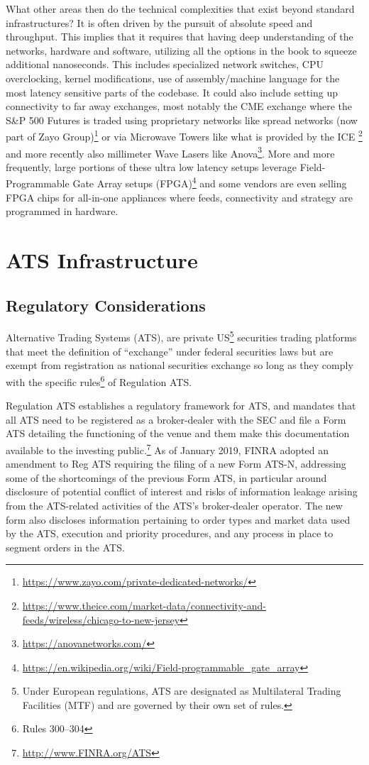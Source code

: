 What other areas then do the technical complexities that exist beyond standard infrastructures? It is often driven by the pursuit of absolute speed and throughput. This implies that it requires that having deep understanding of the networks, hardware and software, utilizing all the options in the book to squeeze additional nanoseconds. This includes specialized network switches, CPU overclocking, kernel modifications, use of assembly/machine language for the most latency sensitive parts of the codebase. It could also include setting up connectivity to far away exchanges, most notably the CME exchange where the S\&P 500 Futures is traded using proprietary networks like spread networks (now part of Zayo Group)\footnote{\url{https://www.zayo.com/private-dedicated-networks/}} or via Microwave Towers like what is provided by the ICE \footnote{\url{https://www.theice.com/market-data/connectivity-and-feeds/wireless/chicago-to-new-jersey}} and more recently also millimeter Wave Lasers like Anova\footnote{\url{https://anovanetworks.com/}}. More and more frequently, large portions of these ultra low latency setups leverage Field-Programmable Gate Array setups (FPGA)\footnote{\url{https://en.wikipedia.org/wiki/Field-programmable_gate_array}} and some vendors are even selling FPGA chips for all-in-one appliances where  feeds, connectivity and strategy are programmed in hardware.



\section{ATS Infrastructure\label{sec:ats_infra}}
\subsection{Regulatory Considerations\label{sec:reg_considerations}}

Alternative Trading Systems (ATS), are private US\footnote{Under European regulations, ATS are designated as Multilateral Trading Facilities (MTF) and are governed by their own set of rules.} securities trading platforms that meet the definition of ``exchange'' under federal securities laws but are exempt from registration as national securities exchange so long as they comply with the specific rules\footnote{Rules 300--304} of Regulation ATS.


Regulation ATS establishes a regulatory framework for ATS, and mandates that all ATS need to be registered as a broker-dealer with the SEC and file a Form ATS detailing the functioning of the venue and them make this documentation available to the investing public.\footnote{\url{http://www.FINRA.org/ATS}} As of January 2019, FINRA adopted an amendment to Reg ATS requiring the filing of a new Form ATS-N, addressing some of the shortcomings of the previous Form ATS, in particular around disclosure of potential conflict of interest and risks of information leakage arising from the ATS-related activities of the ATS's broker-dealer operator. The new form also discloses information pertaining to order types and market data used by the ATS, execution and priority procedures, and any process in place to segment orders in the ATS.


